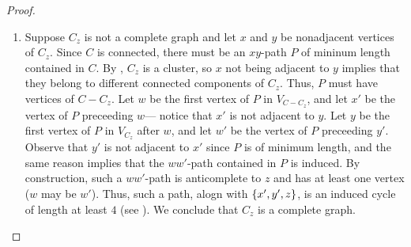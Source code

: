 \begin{proof}
\begin{enumerate}[label=(\roman*)]
            \begin{figure}[htb!]
                \centering
                \caption{An induced copy of $P_5$ given that both $V_{C-C_z}$
                    and $V_{C'-C'_z}$ are nonempty.}
                \label{fig:additional_2}
            \end{figure}

        \item Suppose $C_z$ is not a complete graph and let $x$ and $y$ be
            nonadjacent vertices of $C_z$. Since $C$ is connected, there must be
            an $xy$-path $P$ of mininum length contained in $C$. By
            , $C_z$ is a cluster, so $x$ not
            being adjacent to $y$ implies that they belong to different
            connected components of $C_z$. Thus, $P$ must have vertices of
            $C-C_z$. Let $w$ be the first vertex of $P$ in $V_{C-C_z}$, and let
            $x'$ be the vertex of $P$ preceeding $w$--- notice that $x'$ is not
            adjacent to $y$. Let $y$ be the first vertex of $P$ in $V_{C_z}$
            after $w$, and let $w'$ be the vertex of $P$ preceeding $y'$.
            Observe that $y'$ is not adjacent to $x'$ since $P$ is of minimum
            length, and the same reason implies that the $ww'$-path contained in
            $P$ is induced. By construction, such a $ww'$-path is anticomplete
            to $z$ and has at least one vertex ($w$ may be $w'$). Thus, such a
            path, alogn with $\left\{x',y',z\right\}$, is an induced cycle of length at
            least $4$ (see ). We conclude that $C_z$ is a
            complete graph.


\end{enumerate}
\end{proof}
